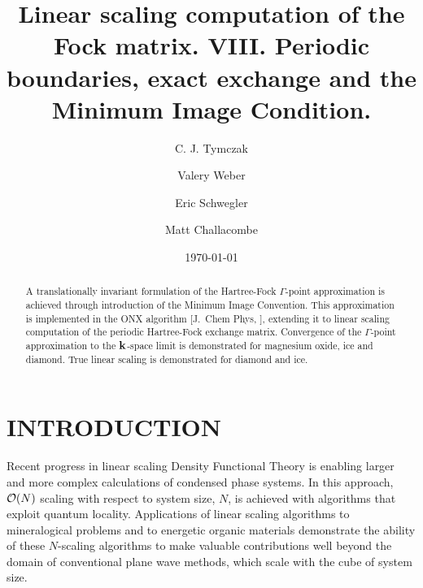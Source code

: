 \documentclass[prb,aps,nobibnotes,twocolumn,doublespace,twocolumngrid,superbib]{revtex4}
\begin{document}
\title{Linear scaling computation of the Fock matrix. VIII. Periodic \\
     boundaries, exact exchange and the Minimum Image Condition. }

\author{C. J. Tymczak}
\author{Valery Weber}
\author{Eric Schwegler}
\author{Matt Challacombe}




\date{\today}
\begin{abstract}
A translationally invariant formulation of the Hartree-Fock $\Gamma$-point approximation
is achieved through introduction of the Minimum Image Convention.  This approximation is 
implemented  in the ONX algorithm [J.~Chem Phys, ], extending it to linear scaling 
computation of the periodic Hartree-Fock exchange matrix.  Convergence of the 
$\Gamma$-point approximation to the ${\bf k}$-space limit is demonstrated for 
magnesium oxide, ice and diamond.  True linear scaling is demonstrated for diamond and ice. 
\end{abstract}

\pacs{}

\maketitle


\section{INTRODUCTION}

Recent progress in linear scaling Density Functional Theory is enabling larger and 
more complex calculations of condensed phase systems.  In this approach, ${\cal O}(N)$
scaling with respect to system size, $N$, is achieved with algorithms that exploit 
quantum locality.  Applications of linear scaling algorithms to mineralogical problems 
\cite{MCraig04} and to energetic organic materials 
demonstrate the ability of these $N$-scaling algorithms to make valuable contributions well 
beyond the domain of conventional plane wave methods, which scale with the cube of system size.  
\end{document}

